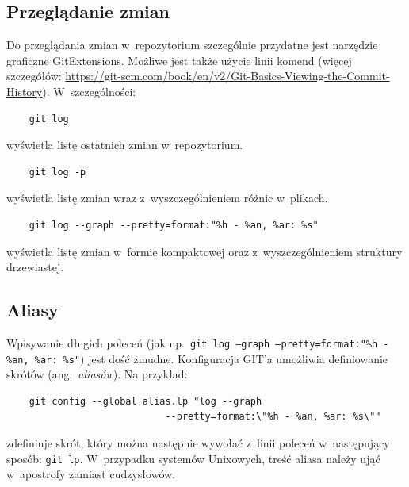 \documentclass[12pt]{article}
\begin{document}
        \subsection*{Przeglądanie zmian}
        Do przeglądania zmian w~repozytorium szczególnie przydatne jest narzędzie graficzne GitExtensions. Możliwe jest także użycie linii komend (więcej szczegółów: \url{https://git-scm.com/book/en/v2/Git-Basics-Viewing-the-Commit-History}). W~szczególności:
        \begin{verbatim}
    git log
        \end{verbatim}
        wyświetla listę ostatnich zmian w~repozytorium.
        \begin{verbatim}
    git log -p
        \end{verbatim}
        wyświetla listę zmian wraz z~wyszczególnieniem różnic w~plikach.
        \begin{verbatim}
    git log --graph --pretty=format:"%h - %an, %ar: %s"
        \end{verbatim}
        wyświetla listę zmian w~formie kompaktowej oraz z~wyszczególnieniem struktury drzewiastej.
        
        \subsection*{Aliasy}
        Wpisywanie długich poleceń (jak np.~\texttt{git log --graph --pretty=format:"\%h - \%an, \%ar: \%s"}) jest dość żmudne. Konfiguracja GIT'a umożliwia definiowanie skrótów (ang.~\textit{aliasów}). Na przykład:
        \begin{verbatim}
    git config --global alias.lp "log --graph 
                            --pretty=format:\"%h - %an, %ar: %s\""
        \end{verbatim}
        zdefiniuje skrót, który można następnie wywołać z~linii poleceń w~następujący sposób: \texttt{git lp}. W~przypadku systemów Unixowych, treść aliasa należy ująć w~apostrofy zamiast cudzysłowów.
\end{document}
